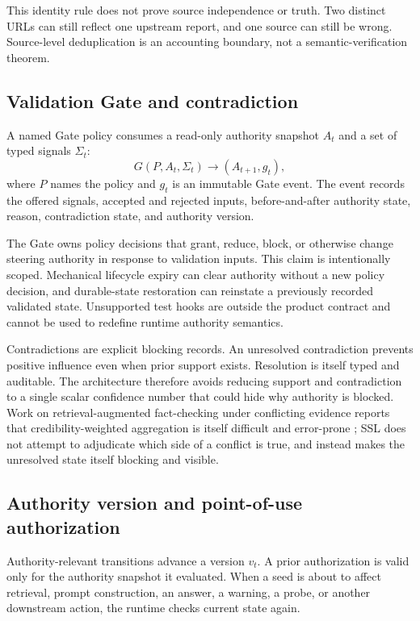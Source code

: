 \documentclass[11pt]{article}
\begin{document}
This identity rule does not prove source independence or truth. Two distinct URLs can still reflect one upstream report, and one source can still be wrong. Source-level deduplication is an accounting boundary, not a semantic-verification theorem.

\subsection{Validation Gate and contradiction}

A named Gate policy consumes a read-only authority snapshot $A_t$ and a set of typed signals $\Sigma_t$:
\begin{equation}
  G(P,A_t,\Sigma_t) \rightarrow (A_{t+1},g_t),
\end{equation}
where $P$ names the policy and $g_t$ is an immutable Gate event. The event records the offered signals, accepted and rejected inputs, before-and-after authority state, reason, contradiction state, and authority version.

The Gate owns policy decisions that grant, reduce, block, or otherwise change steering authority in response to validation inputs. This claim is intentionally scoped. Mechanical lifecycle expiry can clear authority without a new policy decision, and durable-state restoration can reinstate a previously recorded validated state. Unsupported test hooks are outside the product contract and cannot be used to redefine runtime authority semantics.

Contradictions are explicit blocking records. An unresolved contradiction prevents positive influence even when prior support exists. Resolution is itself typed and auditable. The architecture therefore avoids reducing support and contradiction to a single scalar confidence number that could hide why authority is blocked. Work on retrieval-augmented fact-checking under conflicting evidence reports that credibility-weighted aggregation is itself difficult and error-prone \citep{ge2025conflicting}; SSL does not attempt to adjudicate which side of a conflict is true, and instead makes the unresolved state itself blocking and visible.

\subsection{Authority version and point-of-use authorization}

Authority-relevant transitions advance a version $v_t$. A prior authorization is valid only for the authority snapshot it evaluated. When a seed is about to affect retrieval, prompt construction, an answer, a warning, a probe, or another downstream action, the runtime checks current state again.
\end{document}
